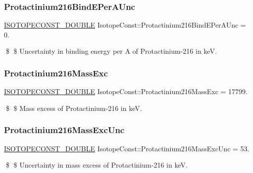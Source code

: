 \subsubsection{\texorpdfstring{Protactinium216\+Bind\+E\+Per\+A\+Unc}{Protactinium216BindEPerAUnc}}
{\footnotesize\ttfamily \mbox{\hyperlink{group___isotope_const-_macros_ga8f45a7272ce02c0b4c65c44636ed719a}{I\+S\+O\+T\+O\+P\+E\+C\+O\+N\+S\+T\+\_\+\+D\+O\+U\+B\+LE}} Isotope\+Const\+::\+Protactinium216\+Bind\+E\+Per\+A\+Unc = 0.}

\$ \$ Uncertainty in binding energy per A of Protactinium-\/216 in keV. \mbox{\label{group___isotope_const-_protactinium-_pa216_ga1015d9cdc513d97b7cc7937ecaed1eec}} 
\subsubsection{\texorpdfstring{Protactinium216\+Mass\+Exc}{Protactinium216MassExc}}
{\footnotesize\ttfamily \mbox{\hyperlink{group___isotope_const-_macros_ga8f45a7272ce02c0b4c65c44636ed719a}{I\+S\+O\+T\+O\+P\+E\+C\+O\+N\+S\+T\+\_\+\+D\+O\+U\+B\+LE}} Isotope\+Const\+::\+Protactinium216\+Mass\+Exc = 17799.}

\$ \$ Mass excess of Protactinium-\/216 in keV. \mbox{\label{group___isotope_const-_protactinium-_pa216_ga67388744413e602e282c34ad263d1fa6}} 
\subsubsection{\texorpdfstring{Protactinium216\+Mass\+Exc\+Unc}{Protactinium216MassExcUnc}}
{\footnotesize\ttfamily \mbox{\hyperlink{group___isotope_const-_macros_ga8f45a7272ce02c0b4c65c44636ed719a}{I\+S\+O\+T\+O\+P\+E\+C\+O\+N\+S\+T\+\_\+\+D\+O\+U\+B\+LE}} Isotope\+Const\+::\+Protactinium216\+Mass\+Exc\+Unc = 53.}

\$ \$ Uncertainty in mass excess of Protactinium-\/216 in keV. \mbox{\label{group___isotope_const-_protactinium-_pa216_ga485e2a35c6dc770f2360e196aa43fd47}} 
